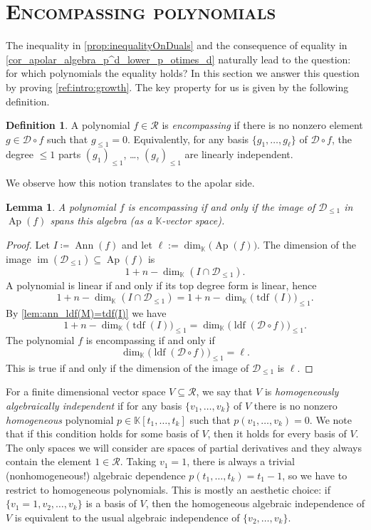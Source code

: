 \documentclass[a4paper,11pt,reqno]{amsart}
\newcommand{\calD}{\mathcal{D}}
\newcommand{\calR}{\mathcal{R}}
\newcommand{\bbK}{\mathbb{K}}
\DeclareMathOperator{\Ann}{Ann}
\DeclareMathOperator{\Ap}{Ap}
\DeclareMathOperator{\im}{im}
\DeclareMathOperator{\ldf}{ldf}
\DeclareMathOperator{\tdf}{tdf}
\numberwithin{equation}{section}
\theoremstyle{definition}
\newtheorem{defn}[equation]{Definition}
\theoremstyle{plain}
\newtheorem{lem}[defn]{Lemma}
\theoremstyle{remark}
\begin{document}
\section{\normalfont \scshape{}\selectfont Encompassing polynomials}\label{sec:encompassing}
{The inequality} in \autoref{prop:inequalityOnDuals} and the consequence of equality
in \autoref{cor_apolar_algebra_p^d_lower_p_otimes_d}
naturally {lead to the question: for which polynomials the equality holds?} In this section we answer this question by proving
\autoref{ref:intro:growth}. The key property for us
is given by the following definition.
\begin{defn}\label{defn:encompassing}
    A polynomial $f\in\calR$ is \emph{encompassing} if there is no nonzero element $g\in\calD
\circ    f$ such that $g_{\leq 1} = 0$. Equivalently, for any basis $\{g_1, \ldots
    ,g_\ell\}$ of $\calD\circ f$, the degree $\leq 1$ parts $(g_1)_{\leq 1}$, \ldots ,
    $(g_\ell)_{\leq 1}$ are linearly independent.
\end{defn}
We observe how this notion translates to the
apolar side.
\begin{lem}\label{lem:encompassingInDualVariables}
    A polynomial $f$ is encompassing if and only if the image of
    $\calD_{\leq 1}$ in $\Ap(f)$ spans this algebra (as a $\bbK$-vector space).
\end{lem}
\begin{proof}
    Let $I \coloneq \Ann(f)$ and let $\ell := \dim_{\bbK} \bigl(\Ap(f)\bigr)$. The dimension of the image $\im(\calD_{\leq 1})
    \subseteq \Ap(f)$ is \[1+n - \dim_{\bbK} (I\cap \calD_{\leq 1}).\]
    A {polynomial} is linear if and only if its top degree form is linear, hence \[1+n-\dim_{\bbK}(I\cap \calD_{\leq 1}) = 1+n - \dim_{\bbK} \bigl(\tdf(I)\bigr)_{\leq 1}.\]
    By \autoref{lem:ann_ldf(M)=tdf(I)} we have
    \[
1+n-\dim_{\bbK} \bigl(\tdf(I)\bigr)_{\leq 1} = \dim_{\bbK} \bigl(\ldf(\calD \circ f)\bigr)_{\leq 1}.
    \]
    The polynomial $f$ is encompassing {if and only if} \[\dim_{\bbK} \bigl(\ldf(\calD \circ
    f)\bigr)_{\leq 1} = \ell.\] This {is true if and only if} the dimension of the image
    of $\calD_{\leq 1}$ is $\ell$.
\end{proof}

For {a finite dimensional} vector space $V\subseteq\calR$, we say that $V$ is
\textit{homogeneously algebraically independent} if for any basis
$\{v_1,\dots,v_k\}$ of $V$ there is no nonzero \emph{homogeneous} polynomial
$p\in\bbK[t_1,\dots,t_k]$ such that $p(v_1,\dots,v_k)=0$. {We note} that if this condition holds for some basis of $V$, then it holds for every basis of $V$.
 The only spaces we
will consider are spaces of partial derivatives and they always contain the
element $1\in \calR$. Taking $v_1 = 1$, there is always a trivial
(nonhomogeneous!) algebraic
dependence $p(t_1, \ldots ,t_k) = t_1-1$, so we {have} to restrict to
homogeneous polynomials. {This} is mostly an aesthetic choice: if $\{v_1 = 1,v_2, \ldots ,v_k\}$ is
a basis of $V$, then {the homogeneous} algebraic independence of $V$ is equivalent
to {the usual} algebraic independence of $\{v_2, \ldots ,v_k\}$.
\end{document}
